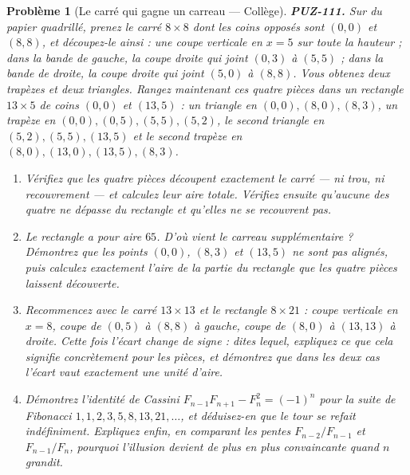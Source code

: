 \documentclass[11pt]{article}
\newtheorem{problem}{Problème}
\begin{document}
\bigskip

\begin{problem}[{Le carré qui gagne un carreau --- Collège}]
\textbf{PUZ-111.} Sur du papier quadrillé, prenez le carré $ 8 \times 8 $ dont les coins
opposés sont $ (0,0) $ et $ (8,8) $, et découpez-le ainsi : une coupe verticale en
$ x = 5 $ sur toute la hauteur ; dans la bande de gauche, la coupe droite qui joint
$ (0,3) $ à $ (5,5) $ ; dans la bande de droite, la coupe droite qui joint $ (5,0) $ à
$ (8,8) $. Vous obtenez deux trapèzes et deux triangles. Rangez maintenant ces quatre pièces
dans un rectangle $ 13 \times 5 $ de coins $ (0,0) $ et $ (13,5) $ : un triangle en
$ (0,0), (8,0), (8,3) $, un trapèze en $ (0,0), (0,5), (5,5), (5,2) $, le second triangle
en $ (5,2), (5,5), (13,5) $ et le second trapèze en $ (8,0), (13,0), (13,5), (8,3) $.
\begin{enumerate}
\item[(a)] Vérifiez que les quatre pièces découpent exactement le carré --- ni trou, ni recouvrement ---
et calculez leur aire totale. Vérifiez ensuite qu'aucune des quatre ne dépasse du rectangle et
qu'elles ne se recouvrent pas.
\item[(b)] Le rectangle a pour aire $ 65 $. D'où vient le carreau supplémentaire ? Démontrez que
les points $ (0,0) $, $ (8,3) $ et $ (13,5) $ ne sont pas alignés, puis calculez
exactement l'aire de la partie du rectangle que les quatre pièces laissent découverte.
\item[(c)] Recommencez avec le carré $ 13 \times 13 $ et le rectangle $ 8 \times 21 $ : coupe
verticale en $ x = 8 $, coupe de $ (0,5) $ à $ (8,8) $ à gauche, coupe de $ (8,0) $ à
$ (13,13) $ à droite. Cette fois l'écart change de signe : dites lequel, expliquez ce que
cela signifie concrètement pour les pièces, et démontrez que dans les deux cas l'écart vaut
exactement une unité d'aire.
\item[(d)] Démontrez l'identité de Cassini $ F_{n-1}F_{n+1} - F_n^2 = (-1)^n $ pour la suite de
Fibonacci $ 1, 1, 2, 3, 5, 8, 13, 21, \dots $, et déduisez-en que le tour se refait
indéfiniment. Expliquez enfin, en comparant les pentes $ F_{n-2}/F_{n-1} $ et
$ F_{n-1}/F_n $, pourquoi l'illusion devient de plus en plus convaincante quand $ n $
grandit.
\end{enumerate}

\end{problem}
\end{document}
